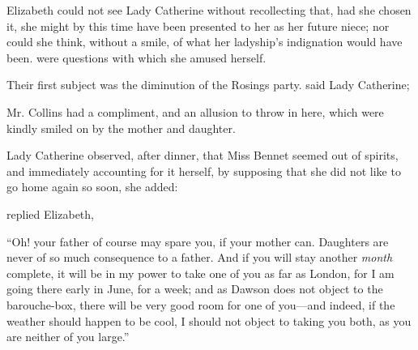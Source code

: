 Elizabeth could not see Lady Catherine without recollecting that, had she chosen it, she might by this time have been presented to her as her future niece; nor could she think, without a smile, of what her ladyship's indignation would have been.  were questions with which she amused herself.

Their first subject was the diminution of the Rosings party.  said Lady Catherine; 

Mr. Collins had a compliment, and an allusion to throw in here, which were kindly smiled on by the mother and daughter.

Lady Catherine observed, after dinner, that Miss Bennet seemed out of spirits, and immediately accounting for it herself, by supposing that she did not like to go home again so soon, she added:


 replied Elizabeth, 



“Oh! your father of course may spare you, if your mother can. Daughters are never of so much consequence to a father. And if you will stay another {\em month} complete, it will be in my power to take one of you as far as London, for I am going there early in June, for a week; and as Dawson does not object to the barouche-box, there will be very good room for one of you---and indeed, if the weather should happen to be cool, I should not object to taking you both, as you are neither of you large.”

